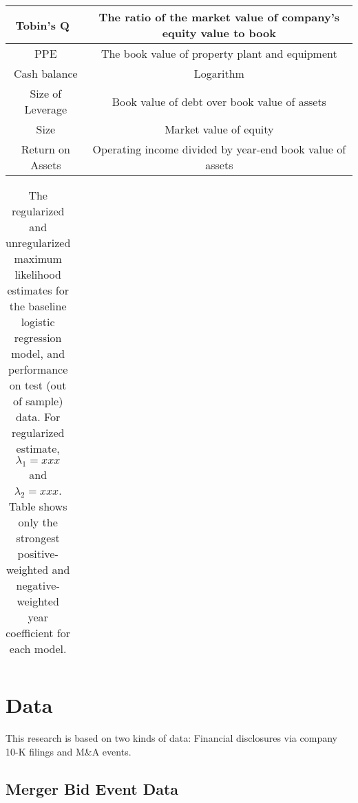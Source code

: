 \documentclass[11pt]{article}
\begin{document}
\begin{table}
  \begin{tabular}{|c|c|}
    \hline
Tobin's Q~\cite{xxxx} & The ratio of the market value of company's equity value to book \\ \hline
PPE & The book value of property plant and equipment \\ \hline
Cash balance & Logarithm \\ \hline
Size of Leverage & Book value of debt over book value of assets \\ \hline
Size & Market value of equity \\ \hline
Return on Assets & Operating income divided by year-end book value of
                   assets \\ \hline
  \end{tabular}
  \label{tab:financial}
  \caption{}
\end{table}

\begin{table}
  \begin{tabular}{|c|c|}
  \end{tabular}
  \label{tab:baseline_results}
  \caption{
The regularized and unregularized maximum likelihood estimates for the
baseline logistic regression model, and performance on test (out of
sample) data. For regularized estimate, $\lambda_{1} = xxx$ and
$\lambda_{2} = xxx$. Table shows only the strongest positive-weighted and negative-weighted
year coefficient for each model.}
\end{table}


\section{Data}

This research is based on two kinds of data: Financial disclosures via
company 10-K filings and M\&A events.


\subsection{Merger Bid Event Data}
\end{document}
